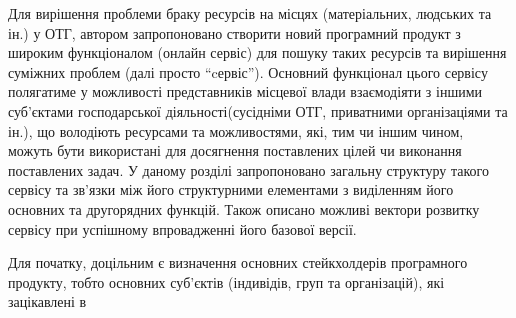 Для вирішення проблеми браку ресурсів на місцях (матеріальних, людських та ін.) у ОТГ, автором запропоновано створити новий програмний продукт з широким функціоналом (онлайн сервіс) для пошуку таких ресурсів та вирішення суміжних проблем (далі просто \foreignquote{ukrainian}{cервіс}). Основний функціонал цього сервісу полягатиме у можливості представників місцевої влади взаємодіяти з іншими суб'єктами господарської діяльності(сусідніми ОТГ, приватними організаціями та ін.), що володіють ресурсами та можливостями, які, тим чи іншим чином, можуть бути використані для досягнення поставлених цілей чи виконання поставлених задач. У даному розділі запропоновано загальну структуру такого сервісу та зв'язки між його структурними елементами з виділенням його основних та другорядних функцій. Також описано можливі вектори розвитку сервісу при успішному впровадженні його базової версії. 

Для початку, доцільним є визначення основних стейкхолдерів програмного продукту, тобто основних суб'єктів (індивідів, груп та організацій), які зацікавлені в 
